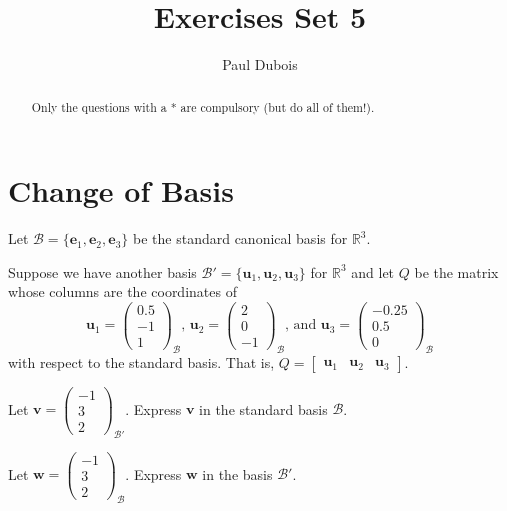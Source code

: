 \documentclass[]{article}
\title{Exercises Set 5}
\author{Paul Dubois}
\begin{document}
	
	\maketitle
	
	\begin{abstract}
		Only the questions with a * are compulsory (but do all of them!).
	\end{abstract}	
	
	\section{Change of Basis}

	Let $\mathcal{B} = \{ \mathbf{e}_1, \mathbf{e}_2, \mathbf{e}_3 \}$ be the standard canonical basis for $\mathbb{R}^3$.

	Suppose we have another basis $\mathcal{B}' = \{ \mathbf{u}_1, \mathbf{u}_2, \mathbf{u}_3 \}$ for $\mathbb{R}^3$ and let $Q$ be the matrix whose columns are the coordinates of 
	$$
	\mathbf{u}_1 = \begin{pmatrix} 0.5 \\ -1 \\ 1 \end{pmatrix}_{\mathcal{B}}
	\textit{, }
	\mathbf{u}_2 = \begin{pmatrix} 2 \\ 0 \\ -1 \end{pmatrix}_{\mathcal{B}}
	\text{, and }
	\mathbf{u}_3 = \begin{pmatrix} -0.25 \\ 0.5 \\ 0 \end{pmatrix}_{\mathcal{B}}
	$$
	with respect to the standard basis.
	That is, $
	Q = \begin{bmatrix}
		\mathbf{u}_1 & \mathbf{u}_2 & \mathbf{u}_3
	\end{bmatrix}
	$.
	
	Let $\mathbf{v} = \begin{pmatrix} -1 \\ 3 \\ 2 \end{pmatrix}_{\mathcal{B}'}$.
	Express $\mathbf{v}$ in the standard basis $\mathcal{B}$.
	
	Let $\mathbf{w} = \begin{pmatrix} -1 \\ 3 \\ 2 \end{pmatrix}_{\mathcal{B}}$.
	Express $\mathbf{w}$ in the basis $\mathcal{B}'$.
	
\end{document}
